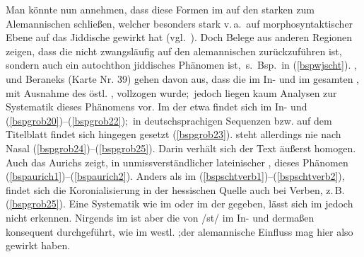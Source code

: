 {\largerpage
Man könnte nun annehmen, dass diese Formen im \hai{{\SWJ}} auf den starken  zum Alemannischen schließen, welcher besonders stark v.\,a.\, auf morphosyntaktischer Ebene auf das Jiddische gewirkt hat (vgl.\, \citealt{Schaefer2014}). Doch Belege aus anderen Regionen zeigen, dass die  nicht zwangsläufig auf den alemannischen  zurückzuführen ist, sondern auch ein autochthon jiddisches Phänomen ist,\,  s.\, Bsp.\,  in (\ref{bspwjscht}). \cite[98f]{GuggenheimGruenberg1958}, \cite[20]{Beem1970} und Beraneks  (Karte Nr. 39) gehen davon aus, dass die  im In- und  im gesamten \hai{{\WJ}}, mit Ausnahme des östl. \hai{{\NWJ}}, vollzogen wurde;\, jedoch liegen kaum Analysen zur Systematik dieses Phänomens vor. Im  der  etwa findet sich  im In- und  (\ref{bspgrob20})–(\ref{bspgrob22});\, in deutschsprachigen Sequenzen bzw. auf dem Titelblatt findet sich hingegen  gesetzt (\ref{bspgrob23}).  steht allerdings nie nach Nasal (\ref{bspgrob24})–(\ref{bspgrob25}). Darin verhält sich der Text äußerst homogen. Auch das \hai{{\NWJ}} Aurichs zeigt, in unmissverständlicher lateinischer , dieses Phänomen (\ref{bspaurich1})–(\ref{bspaurich2}). Anders als im \hai{{\OJ}}  (\ref{bspschtverb1})–(\ref{bspschtverb2}), findet sich die Koronialisierung in der hessischen Quelle auch bei Verben, z.\,B.\, (\ref{bspgrob25}).  Eine  Systematik wie im \hai{{\OJ}} oder im \hai{{\WJ}} der  gegeben, lässt sich im \hai{{\LiJi}} jedoch nicht erkennen. Nirgends im \hai{{\WJ}} ist aber die  von /st/ im In- und  dermaßen konsequent durchgeführt, wie im westl. \hai{{\SWJ}};der alemannische Einfluss mag hier also gewirkt haben.

   }
